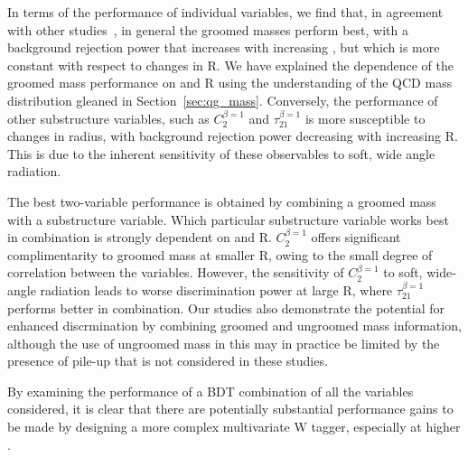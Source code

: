 In terms of the performance of individual variables, we find that, in
agreement with other studies~\cite{ATL-PHYS-PUB-2014-004}, in
general the groomed masses perform best, with a background rejection
power that increases with increasing \pt, but which is more constant
with respect to changes in R. We have explained the dependence of the
groomed mass performance on \pt and R using the understanding of the QCD mass distribution
gleaned in Section~\ref{sec:qg_mass}. Conversely, the performance of other
substructure variables, such as $C_2^{\beta=1}$ and
$\tau_{21}^{\beta=1}$ is more susceptible to changes in radius, with
background rejection power decreasing with increasing R. This is due
to the inherent sensitivity of these observables to soft, wide angle radiation.

The best two-variable performance is obtained by combining a groomed
mass with a substructure variable. Which particular substructure
variable works best in combination is strongly dependent on \pt and
R. $C_2^{\beta=1}$ offers significant complimentarity to groomed mass
at smaller R, owing to the small degree of correlation between the
variables. However, the sensitivity of $C_2^{\beta=1}$ to soft,
wide-angle radiation leads to worse discrimination power at large R,
where $\tau_{21}^{\beta=1}$ performs better in combination. Our
studies also demonstrate the potential for enhanced discrmination by
combining groomed and ungroomed mass information, although the use of
ungroomed mass in this may in practice be limited by the presence of
pile-up that is not considered in these studies.

By examining the performance of a BDT combination of all the variables
considered, it is clear that there are potentially substantial performance gains to be made by designing a more
complex multivariate W tagger, especially at higher \pt.




